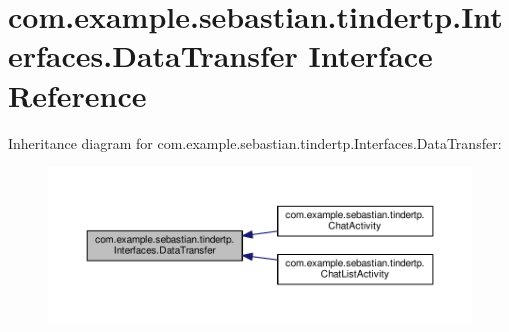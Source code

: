 \hypertarget{interfacecom_1_1example_1_1sebastian_1_1tindertp_1_1Interfaces_1_1DataTransfer}{}\section{com.\+example.\+sebastian.\+tindertp.\+Interfaces.\+Data\+Transfer Interface Reference}
\label{interfacecom_1_1example_1_1sebastian_1_1tindertp_1_1Interfaces_1_1DataTransfer}


Inheritance diagram for com.\+example.\+sebastian.\+tindertp.\+Interfaces.\+Data\+Transfer\+:\nopagebreak
\begin{figure}[H]
\begin{center}
\leavevmode
\includegraphics[width=350pt]{interfacecom_1_1example_1_1sebastian_1_1tindertp_1_1Interfaces_1_1DataTransfer__inherit__graph}
\end{center}
\end{figure}
